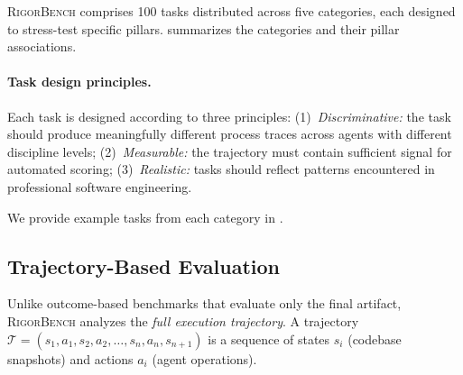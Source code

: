 \documentclass[letterpaper, 10 pt, conference]{ieeeconf}
\newcommand{\bench}{\textsc{RigorBench}}
\begin{document}
\bench{} comprises 100 tasks distributed across five categories, each designed to stress-test specific pillars.
 summarizes the categories and their pillar associations.

\begin{table}[t]
\centering
\caption{Task categories in \bench{}. Each category targets specific pillars while enabling measurement of all seven.}
\label{tab:tasks}
\small
{}
\end{table}

\paragraph{Task design principles.}
Each task is designed according to three principles:
(1)~\emph{Discriminative:} the task should produce meaningfully different process traces across agents with different discipline levels;
(2)~\emph{Measurable:} the trajectory must contain sufficient signal for automated scoring;
(3)~\emph{Realistic:} tasks should reflect patterns encountered in professional software engineering.

We provide example tasks from each category in .

\subsection{Trajectory-Based Evaluation}
\label{sec:scoring}

Unlike outcome-based benchmarks that evaluate only the final artifact, \bench{} analyzes the \emph{full execution trajectory}.
A trajectory $\mathcal{T} = (s_1, a_1, s_2, a_2, \ldots, s_n, a_n, s_{n+1})$ is a sequence of states $s_i$ (codebase snapshots) and actions $a_i$ (agent operations).
\end{document}
